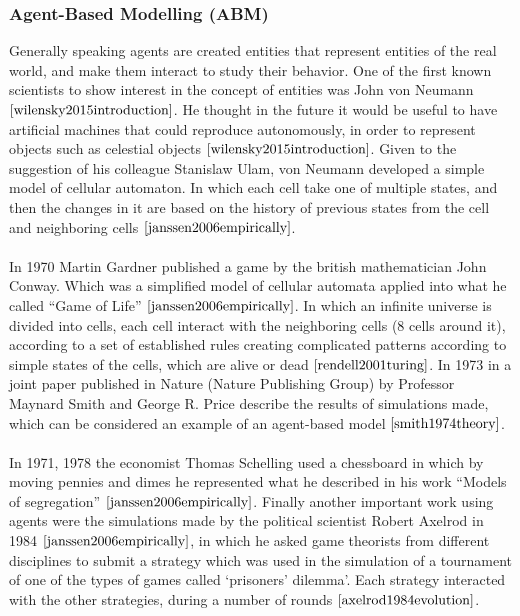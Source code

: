 \documentclass{book}
\begin{document}
\subsubsection{Agent-Based Modelling (ABM)}
Generally speaking agents are created entities that represent entities of the real world, and make them interact to study their behavior. One of the first known scientists to show interest in the concept of entities was John von Neumann $\cite{wilensky2015introduction}$. He thought in the future it would be useful to have artificial machines that could reproduce autonomously, in order to represent objects such as celestial objects $\cite{wilensky2015introduction}$. Given to the suggestion of his colleague Stanislaw Ulam, von Neumann developed a simple model of cellular automaton. In which each cell take one of multiple states, and then the changes in it are based on the history of previous states from the cell and neighboring cells $\cite{janssen2006empirically}$.
\\\\In 1970 Martin Gardner published a game by the british mathematician John Conway. Which was a simplified model of cellular automata applied into what he called “Game of Life” $\cite{janssen2006empirically}$. In which an infinite universe is divided into cells, each cell interact with the neighboring cells (8 cells around it), according to a set of established rules creating complicated patterns according to simple states of the cells, which are alive or dead $\cite{rendell2001turing}$. In 1973 in a joint paper published in Nature (Nature Publishing Group)  by Professor Maynard Smith and George R. Price describe the results of simulations made, which can be considered an example of an agent-based model $\cite{smith1974theory}$.
\\\\In 1971, 1978 the economist Thomas Schelling used a chessboard in which by moving pennies and dimes he represented what he described in his work ``Models of segregation'' $\cite{janssen2006empirically}$.  Finally another important work using agents were the simulations made by the political scientist Robert Axelrod in 1984 $\cite{janssen2006empirically}$, in which he asked game theorists from different disciplines to submit a strategy which was used in the simulation of a tournament of one of the types of games called `prisoners’ dilemma'. Each strategy interacted with the other strategies, during a number of rounds $\cite{axelrod1984evolution}$.
\end{document}
